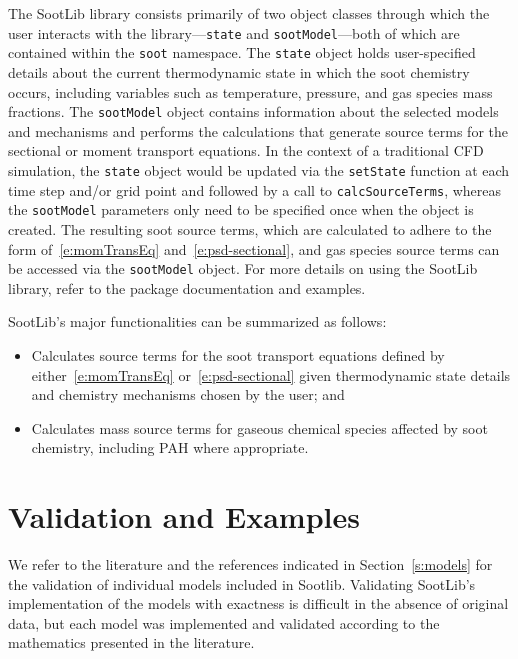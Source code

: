 \documentclass[preprint,letterpaper]{elsarticle}
\begin{document}
The SootLib library consists primarily of two object classes through which the user interacts with the library---\texttt{state} and \texttt{sootModel}---both of which are contained within the \texttt{soot} namespace. The \texttt{state} object holds user-specified details about the current thermodynamic state in which the soot chemistry occurs, including variables such as temperature, pressure, and gas species mass fractions. The \texttt{sootModel} object contains information about the selected models and mechanisms and performs the calculations that generate source terms for the sectional or moment transport equations. In the context of a traditional CFD simulation, the \texttt{state} object would be updated via the \texttt{setState} function at each time step and/or grid point and followed by a call to \texttt{calcSourceTerms}, whereas the \texttt{sootModel} parameters only need to be specified once when the object is created. The resulting soot source terms, which are calculated to adhere to the form of~\eqref{e:momTransEq} and~\eqref{e:psd-sectional}, and gas species source terms can be accessed via the \texttt{sootModel} object. For more details on using the SootLib library, refer to the package documentation and examples.

SootLib's major functionalities can be summarized as follows:
\begin{itemize}
    \item Calculates source terms for the soot transport equations defined by either~\eqref{e:momTransEq} or~\eqref{e:psd-sectional} given thermodynamic state details and chemistry mechanisms chosen by the user; and
    \item Calculates mass source terms for gaseous chemical species affected by soot chemistry, including PAH where appropriate.
\end{itemize}


\section{Validation and Examples}
\label{s:examples}

We refer to the literature and the references indicated in Section~\ref{s:models} for the validation of individual models included in Sootlib. Validating SootLib's implementation of the models with exactness is difficult in the absence of original data, but each model was implemented and validated according to the mathematics presented in the literature.
\end{document}
